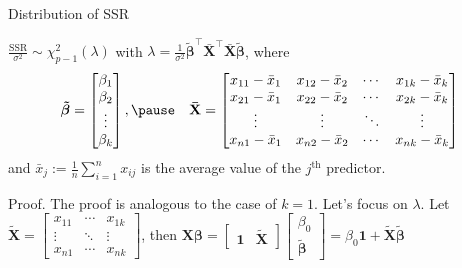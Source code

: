 \documentclass{beamer}
\begin{document}
\begin{frame}{Distribution of SSR}
\begin{theorem}
$\frac{\text{SSR}}{\sigma^2}\sim\chi^2_{p-1}(\lambda)$ \pause with $\lambda=\frac{1}{\sigma^2}\boldsymbol{\tilde\beta}^\top\mathbf{\bar{X}}^\top\mathbf{\bar{X}}\boldsymbol{\tilde\beta}$, \pause where
$$
\boldsymbol{\tilde\beta}=\begin{bmatrix}
\beta_1\\
\beta_2\\
\vdots\\
\beta_k
\end{bmatrix},\pause\quad\mathbf{\bar{X}}=\begin{bmatrix}
x_{11}-\bar{x}_1 & x_{12}-\bar{x}_2 & \cdots & x_{1k}-\bar{x}_k\\
x_{21}-\bar{x}_1 & x_{22}-\bar{x}_2 & \cdots & x_{2k}-\bar{x}_k\\
\vdots & \vdots & \ddots & \vdots\\
x_{n1}-\bar{x}_1 & x_{n2}-\bar{x}_2 & \cdots & x_{nk}-\bar{x}_k
\end{bmatrix}
$$
\pause and $\bar{x}_j:=\frac1n\sum_{i=1}^n x_{ij}$ is the average value of the $j^\text{th}$ predictor.
\end{theorem}
\begin{block}{Proof.}
\pause The proof is analogous to the case of $k=1$. \pause Let's focus on $\lambda$. \pause
Let $\mathbf{\tilde{X}}=\begin{bmatrix}x_{11} & \cdots & x_{1k}\\\vdots & \ddots & \vdots\\x_{n1} & \cdots &  x_{nk}\end{bmatrix}$, \pause  then $\mathbf{X}\boldsymbol\beta=\begin{bmatrix}\mathbf{1} & \mathbf{\tilde{X}}\end{bmatrix}\begin{bmatrix}\beta_0\\\boldsymbol{\tilde\beta}\end{bmatrix}=\beta_0\mathbf{1}+\mathbf{\tilde{X}}\boldsymbol{\tilde\beta}$
\end{block}
\end{frame}
\end{document}
